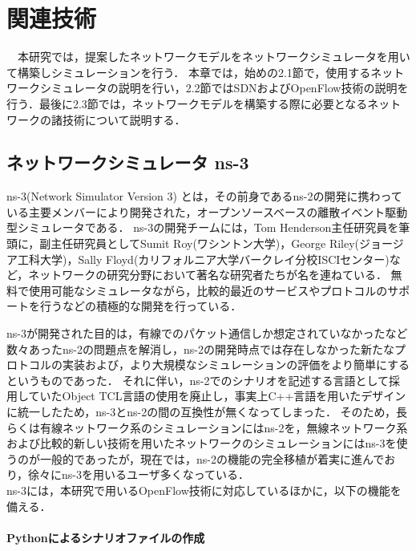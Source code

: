 \chapter{関連技術}

　本研究では，提案したネットワークモデルをネットワークシミュレータを用いて構築しシミュレーションを行う．
本章では，始めの2.1節で，使用するネットワークシミュレータの説明を行い，2.2節ではSDNおよびOpenFlow技術の説明を行う．最後に2.3節では，ネットワークモデルを構築する際に必要となるネットワークの諸技術について説明する．

\section{ネットワークシミュレータ ns-3}

ns-3(Network Simulator Version 3)\cite{ns3} \cite{ns3text} とは，その前身であるns-2の開発に携わっている主要メンバーにより開発された，オープンソースベースの離散イベント駆動型シミュレータである．
ns-3の開発チームには，Tom Henderson主任研究員を筆頭に，副主任研究員としてSumit Roy(ワシントン大学)，George Riley(ジョージア工科大学)，Sally Floyd(カリフォルニア大学バークレイ分校ISCIセンター)など，ネットワークの研究分野において著名な研究者たちが名を連ねている．
無料で使用可能なシミュレータながら，比較的最近のサービスやプロトコルのサポートを行うなどの積極的な開発を行っている．

ns-3が開発された目的は，有線でのパケット通信しか想定されていなかったなど数々あったns-2の問題点を解消し，ns-2の開発時点では存在しなかった新たなプロトコルの実装および，より大規模なシミュレーションの評価をより簡単にするというものであった．
それに伴い，ns-2でのシナリオを記述する言語として採用していたObject TCL言語の使用を廃止し，事実上C++言語を用いたデザインに統一したため，ns-3とns-2の間の互換性が無くなってしまった．
そのため，長らくは有線ネットワーク系のシミュレーションにはns-2を，無線ネットワーク系および比較的新しい技術を用いたネットワークのシミュレーションにはns-3を使うのが一般的であったが，現在では，ns-2の機能の完全移植が着実に進んでおり，徐々にns-3を用いるユーザ多くなっている． \\

ns-3には，本研究で用いるOpenFlow技術に対応しているほかに，以下の機能を備える．

\subsubsection{Pythonによるシナリオファイルの作成}

